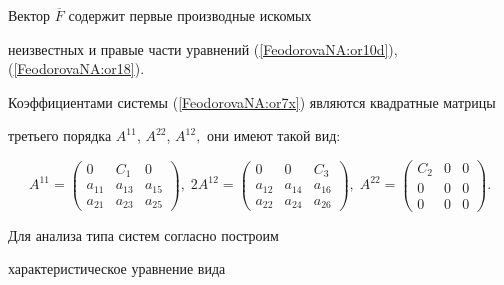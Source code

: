 Вектор $\overline{F}$ содержит первые производные искомых

неизвестных и правые части уравнений (\ref{FeodorovaNA:or10d}), (\ref{FeodorovaNA:or18}).

Коэффициентами системы (\ref{FeodorovaNA:or7x}) являются квадратные матрицы

третьего порядка $A^{11}$, $A^{22}$, $A^{12},$ они имеют такой вид:

\[A^{11}=

\left(

\begin{array}{ccc}

0&C_1& 0\\

a_{11}&a_{13} &a_{15} \\

a_{21}&a_{23} &a_{25}

\end{array}

\right), \;



 2A^{12}= \left(

\begin{array}{ccc}

0&0& C_3\\

a_{12}&a_{14} &a_{16} \\

a_{22}&a_{24} &a_{26}

\end{array}

\right), \;



 A^{22}= \left(

\begin{array}{ccc}

C_2&0&0\\

0&0&0\\

0&0&0

\end{array}

\right).

\]



Для анализа типа систем согласно \cite{FeodorovaNA:Bi2} построим

характеристическое уравнение вида

